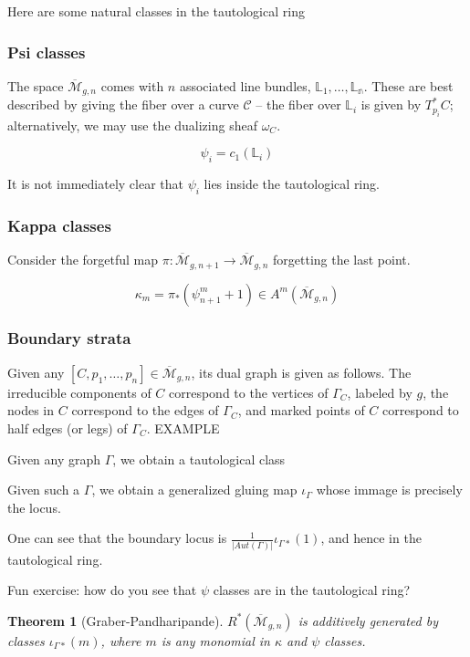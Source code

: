 \documentclass{amsart}
\newtheorem{theorem}{Theorem}
\newcommand{\Mbar}{\overline{\mathcal{M}}}
\newcommand{\Aut}{Aut}
\begin{document}
Here are some natural classes in the tautological ring

\subsubsection{Psi classes}
The space $\Mbar_{g,n}$ comes with $n$ associated line bundles, $\mathbb{L}_1,\dots, \mathbb{L_n}$.  These are best described by giving the fiber over a curve $\mathcal{C}$ -- the fiber over $\mathbb{L}_i$ is given by $T^*_{p_i}C$; alternatively, we may use the dualizing sheaf $\omega_C$.

$$\psi_i=c_1(\mathbb{L}_i)$$

It is not immediately clear that $\psi_i$ lies inside the tautological ring.

\subsubsection{Kappa classes}

Consider the forgetful map $\pi:\Mbar_{g,n+1}\to\Mbar_{g,n}$ forgetting the last point.

$$\kappa_m=\pi_*(\psi_{n+1}^m+1)\in A^m(\Mbar_{g,n})$$
\subsubsection{Boundary strata}
Given any $[C,p_1,\dots,p_n]\in\Mbar_{g,n}$, its dual graph is given as follows.  The irreducible components of $C$ correspond to the vertices of $\Gamma_C$, labeled by $g$, the nodes in $C$ correspond to the edges of $\Gamma_C$, and marked points of $C$ correspond to half edges (or legs) of $\Gamma_C$.
EXAMPLE

Given any graph $\Gamma$, we obtain a tautological class %

Given such a $\Gamma$, we obtain a generalized gluing map $\iota_\Gamma$ whose immage is precisely the locus.   

One can see that the boundary locus is $\frac{1}{|\Aut(\Gamma)|}\iota_{\Gamma*}(1)$, and hence in the tautological ring.



Fun exercise: how do you see that $\psi$ classes are in the tautological ring?


\begin{theorem}[Graber-Pandharipande]

$R^*(\Mbar_{g,n})$ is additively generated by classes $\iota_{\Gamma*}(m)$, where $m$ is any monomial in $\kappa$ and $\psi$ classes.
\end{theorem}
\end{document}
